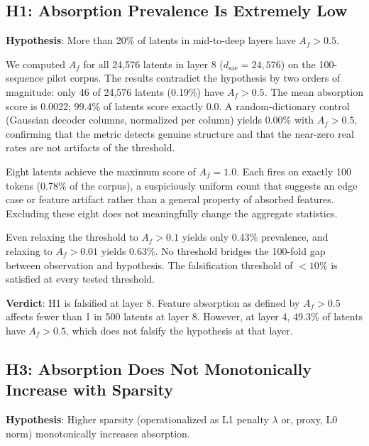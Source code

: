 \documentclass{article}
\begin{document}
\subsection{H1: Absorption Prevalence Is Extremely Low}
\label{sec:h1}

\textbf{Hypothesis}: More than 20\% of latents in mid-to-deep layers have $A_f > 0.5$.

We computed $A_f$ for all 24,576 latents in layer 8 ($d_{\text{sae}} = 24{,}576$) on the 100-sequence pilot corpus. The results contradict the hypothesis by two orders of magnitude: only 46 of 24,576 latents (0.19\%) have $A_f > 0.5$. The mean absorption score is 0.0022; 99.4\% of latents score exactly 0.0. A random-dictionary control (Gaussian decoder columns, normalized per column) yields 0.00\% with $A_f > 0.5$, confirming that the metric detects genuine structure and that the near-zero real rates are not artifacts of the threshold.

Eight latents achieve the maximum score of $A_f = 1.0$. Each fires on exactly 100 tokens (0.78\% of the corpus), a suspiciously uniform count that suggests an edge case or feature artifact rather than a general property of absorbed features. Excluding these eight does not meaningfully change the aggregate statistics.

Even relaxing the threshold to $A_f > 0.1$ yields only 0.43\% prevalence, and relaxing to $A_f > 0.01$ yields 0.63\%. No threshold bridges the 100-fold gap between observation and hypothesis. The falsification threshold of $<10\%$ is satisfied at every tested threshold.

\textbf{Verdict}: H1 is falsified at layer 8. Feature absorption as defined by $A_f > 0.5$ affects fewer than 1 in 500 latents at layer 8. However, at layer 4, 49.3\% of latents have $A_f > 0.5$, which does not falsify the hypothesis at that layer.

\subsection{H3: Absorption Does Not Monotonically Increase with Sparsity}
\label{sec:h3}

\textbf{Hypothesis}: Higher sparsity (operationalized as L1 penalty $\lambda$ or, proxy, L0 norm) monotonically increases absorption.
\end{document}
